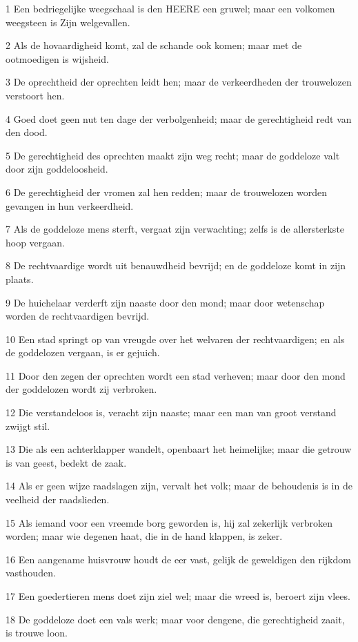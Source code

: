 \par 1 Een bedriegelijke weegschaal is den HEERE een gruwel; maar een volkomen weegsteen is Zijn welgevallen.
\par 2 Als de hovaardigheid komt, zal de schande ook komen; maar met de ootmoedigen is wijsheid.
\par 3 De oprechtheid der oprechten leidt hen; maar de verkeerdheden der trouwelozen verstoort hen.
\par 4 Goed doet geen nut ten dage der verbolgenheid; maar de gerechtigheid redt van den dood.
\par 5 De gerechtigheid des oprechten maakt zijn weg recht; maar de goddeloze valt door zijn goddeloosheid.
\par 6 De gerechtigheid der vromen zal hen redden; maar de trouwelozen worden gevangen in hun verkeerdheid.
\par 7 Als de goddeloze mens sterft, vergaat zijn verwachting; zelfs is de allersterkste hoop vergaan.
\par 8 De rechtvaardige wordt uit benauwdheid bevrijd; en de goddeloze komt in zijn plaats.
\par 9 De huichelaar verderft zijn naaste door den mond; maar door wetenschap worden de rechtvaardigen bevrijd.
\par 10 Een stad springt op van vreugde over het welvaren der rechtvaardigen; en als de goddelozen vergaan, is er gejuich.
\par 11 Door den zegen der oprechten wordt een stad verheven; maar door den mond der goddelozen wordt zij verbroken.
\par 12 Die verstandeloos is, veracht zijn naaste; maar een man van groot verstand zwijgt stil.
\par 13 Die als een achterklapper wandelt, openbaart het heimelijke; maar die getrouw is van geest, bedekt de zaak.
\par 14 Als er geen wijze raadslagen zijn, vervalt het volk; maar de behoudenis is in de veelheid der raadslieden.
\par 15 Als iemand voor een vreemde borg geworden is, hij zal zekerlijk verbroken worden; maar wie degenen haat, die in de hand klappen, is zeker.
\par 16 Een aangename huisvrouw houdt de eer vast, gelijk de geweldigen den rijkdom vasthouden.
\par 17 Een goedertieren mens doet zijn ziel wel; maar die wreed is, beroert zijn vlees.
\par 18 De goddeloze doet een vals werk; maar voor dengene, die gerechtigheid zaait, is trouwe loon.
